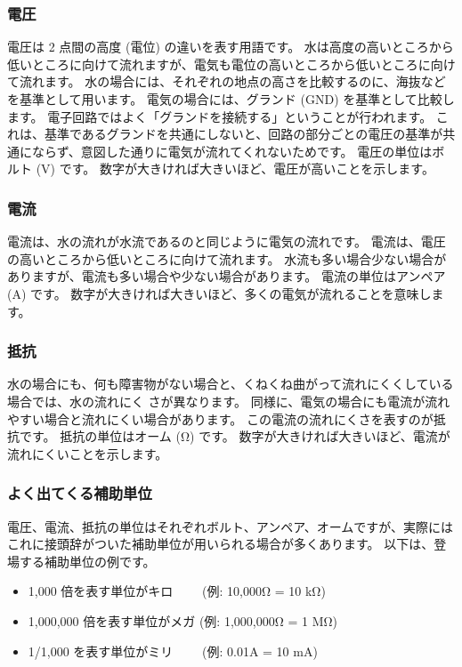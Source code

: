 \documentclass[11pt,a4paper]{jarticle}
\begin{document}
\subsubsection*{電圧}
電圧は 2 点間の高度 (電位) の違いを表す用語です。
水は高度の高いところから低いところに向けて流れますが、電気も電位の高いところから低いところに向けて流れます。
水の場合には、それぞれの地点の高さを比較するのに、海抜などを基準として用います。
電気の場合には、グランド (GND) を基準として比較します。
電子回路ではよく「グランドを接続する」ということが行われます。
これは、基準であるグランドを共通にしないと、回路の部分ごとの電圧の基準が共通にならず、意図した通りに電気が流れてくれないためです。
電圧の単位はボルト (V) です。
数字が大きければ大きいほど、電圧が高いことを示します。

\subsubsection*{電流}
電流は、水の流れが水流であるのと同じように電気の流れです。
電流は、電圧の高いところから低いところに向けて流れます。
水流も多い場合少ない場合がありますが、電流も多い場合や少ない場合があります。
電流の単位はアンペア (A) です。
数字が大きければ大きいほど、多くの電気が流れることを意味します。

\subsubsection*{抵抗}
水の場合にも、何も障害物がない場合と、くねくね曲がって流れにくくしている場合では、水の流れにく
さが異なります。
同様に、電気の場合にも電流が流れやすい場合と流れにくい場合があります。
この電流の流れにくさを表すのが抵抗です。
抵抗の単位はオーム (Ω) です。
数字が大きければ大きいほど、電流が流れにくいことを示します。

\subsubsection*{よく出てくる補助単位}
電圧、電流、抵抗の単位はそれぞれボルト、アンペア、オームですが、実際にはこれに接頭辞がついた補助単位が用いられる場合が多くあります。
以下は、登場する補助単位の例です。
\begin{itemize}
 \item 1,000 倍を表す単位がキロ　　 (例: 10,000Ω = 10 kΩ)
 \item 1,000,000 倍を表す単位がメガ (例: 1,000,000Ω = 1 MΩ)
 \item 1/1,000 を表す単位がミリ　　 (例: 0.01A = 10 mA)
\end{itemize}
\end{document}
